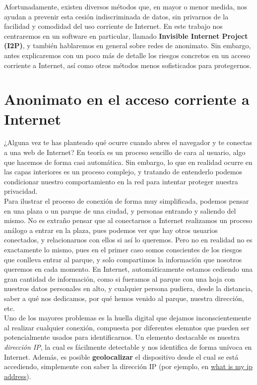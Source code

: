 	Afortunadamente, existen diversos métodos que, en mayor o menor medida, nos ayudan a prevenir esta cesión indiscriminada de datos, sin privarnos de la facilidad y comodidad del uso corriente de Internet. En este trabajo nos centraremos en un software en particular, llamado \textbf{Invisible Internet Project (I2P)}, y también hablaremos en general sobre redes de anonimato. Sin embargo, antes explicaremos con un poco más de detalle los riesgos concretos en un acceso corriente a Internet, así como otros métodos menos sofisticados para protegernos.
	
	
	
	
	\section{Anonimato en el acceso corriente a Internet}
	
	¿Alguna vez te has planteado qué ocurre cuando abres el navegador y te conectas a una web de Internet? En teoría es un proceso sencillo de cara al usuario, algo que hacemos de forma casi automática. Sin embargo, lo que en realidad ocurre en las capas interiores es un proceso complejo, y tratando de entenderlo podemos condicionar nuestro comportamiento en la red para intentar proteger nuestra privacidad.\\
	
	Para ilustrar el proceso de conexión de forma muy simplificada, podemos pensar en una plaza o un parque de una ciudad, y personas entrando y saliendo del mismo. No es extraño pensar que al conectarnos a Internet realizamos un proceso análogo a entrar en la plaza, pues podemos ver que hay otros usuarios conectados, y relacionarnos con ellos si así lo queremos. Pero no en realidad no es exactamente lo mismo, pues en el primer caso somos conscientes de los riesgos que conlleva entrar al parque, y solo compartimos la información que nosotros queremos en cada momento. En Internet, automáticamente estamos cediendo una gran cantidad de información, como si fueramos al parque con una hoja con nuestros datos personales en alto, y cualquier persona pudiera, desde la distancia, saber a qué nos dedicamos, por qué hemos venido al parque, nuestra dirección, etc.\\
	
	Uno de los mayores problemas es la huella digital que dejamos inconscientemente al realizar cualquier conexión, compuesta por diferentes elemntos que pueden ser potencialmente usados para identificarnos. Un elemento destacable es nuestra \textit{dirección IP}, la cual es fácilmente detectable y nos identifica de forma unívoca en Internet. Además, es posible \textbf{geolocalizar} el dispositivo desde el cual se está accediendo, simplemente con saber la dirección IP (por ejemplo, en \href{https://whatismyipaddress.com/}{\url{what is my ip address}}).\\
	
